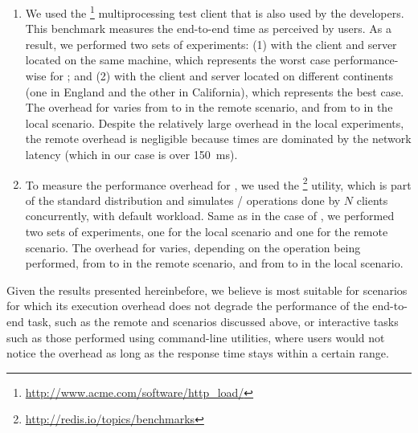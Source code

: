 \begin{enumerate}
\item[\lighttpd] We used the
  \httpload\footnote{\url{http://www.acme.com/software/http_load/}}
  multiprocessing test client that is also used by the \lighttpd developers.
  This benchmark measures the end-to-end time as perceived by users. As a
  result, we performed two sets of experiments: (1) with the client and server
  located on the same machine, which represents the worst case performance-wise
  for \mx; and (2) with the client and server located on different continents
  (one in England and the other in California), which represents the best case.
  The overhead for \lighttpd varies from \minLighttpdRemote to
  \maxLighttpdRemote in the remote scenario, and from \minLighttpdOver to
  \maxLighttpdOver in the local scenario.  Despite the relatively large
  overhead in the local experiments, the remote overhead is negligible because
  times are dominated by the network latency (which in our case is over
  \SI{150}{\milli\second}).

\item[\redis] To measure the performance overhead for \redis, we used the
  \redisbenchmark\footnote{\url{http://redis.io/topics/benchmarks}} utility,
  which is part of the standard \redis distribution and simulates
  / operations done by $N$ clients concurrently, with
  default workload. Same as in the case of \lighttpd, we performed two sets of
  experiments, one for the local scenario and one for the remote scenario. The
  overhead for \redis varies, depending on the operation being performed, from
  \minRedisRemote to \maxRedisRemote in the remote scenario, and from
  \minRedisOver to \maxRedisOver in the local scenario. 

\end{enumerate}

Given the results presented hereinbefore, we believe \mx is most suitable for
scenarios for which its execution overhead does not degrade the performance of
the end-to-end task, such as the remote \redis and \lighttpd scenarios
discussed above, or interactive tasks such as those performed using
command-line utilities, where users would not notice the overhead as long as
the response time stays within a certain range.


